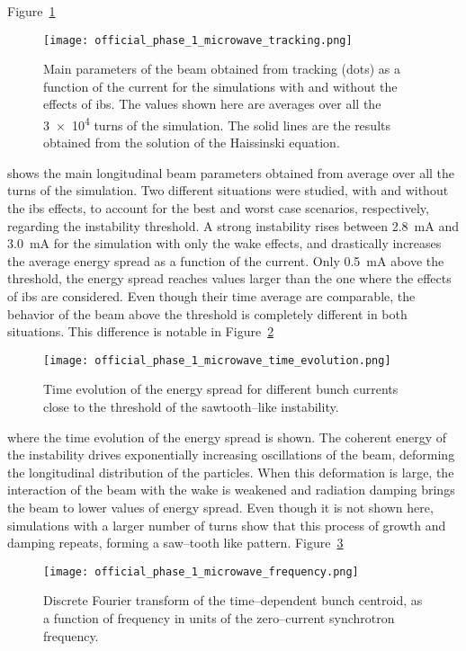     Figure~\ref{fig:ph1_microwave_tracking}
    \begin{figure}
        \centering
        \texttt{[image: official\_phase\_1\_microwave\_tracking.png]}
        \caption[Longitudinal beam parameters obtained from tracking.]{Main parameters of the beam obtained from tracking (dots) as a function of the current for the simulations with and without the effects of \gls{ibs}. The values shown here are averages over all the \num{3e4} turns of the simulation. The solid lines are the results obtained from the solution of the Haissinski equation.}
        \label{fig:ph1_microwave_tracking}
    \end{figure}
    shows the main longitudinal beam parameters obtained from average over all the turns of the simulation. Two different situations were studied, with and without the \gls{ibs} effects, to account for the best and worst case scenarios, respectively, regarding the instability threshold. A strong instability rises between \SI{2.8}{\milli\ampere} and \SI{3.0}{\milli\ampere} for the simulation with only the wake effects, and drastically increases the average energy spread as a function of the current. Only \SI{0.5}{\milli\ampere} above the threshold, the energy spread reaches values larger than the one where the effects of \gls{ibs} are considered. Even though their time average are comparable, the behavior of the beam above the threshold is completely different in both situations. This difference is notable in
    Figure~\ref{fig:ph1_microwave_time_evolution}
    \begin{figure}
        \centering
        \texttt{[image: official\_phase\_1\_microwave\_time\_evolution.png]}
        \caption{Time evolution of the energy spread for different bunch currents close to the threshold of the sawtooth--like instability.}
        \label{fig:ph1_microwave_time_evolution}
    \end{figure}
    where the time evolution of the energy spread is shown. The coherent energy of the instability drives exponentially increasing oscillations of the beam, deforming the longitudinal distribution of the particles. When this deformation is large, the interaction of the beam with the wake is weakened and radiation damping brings the beam to lower values of energy spread. Even though it is not shown here, simulations with a larger number of turns show that this process of growth and damping repeats, forming a saw--tooth like pattern.
    Figure~\ref{fig:ph1_microwave_frequency}
    \begin{figure}
        \centering
        \texttt{[image: official\_phase\_1\_microwave\_frequency.png]}
        \caption{Discrete Fourier transform of the time--dependent bunch centroid, as a function of frequency in units of the zero--current synchrotron frequency.}
        \label{fig:ph1_microwave_frequency}
    \end{figure}
